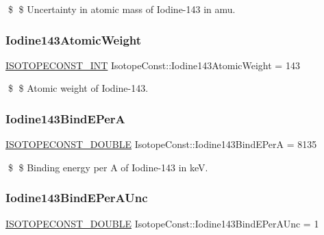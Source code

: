\$ \$ Uncertainty in atomic mass of Iodine-\/143 in amu. \mbox{\label{group___isotope_const-_iodine-_i143_ga991ff8a83be666ace8e998036f409819}} 
\subsubsection{\texorpdfstring{Iodine143\+Atomic\+Weight}{Iodine143AtomicWeight}}
{\footnotesize\ttfamily \mbox{\hyperlink{group___isotope_const-_macros_ga5f18360b3e99483a35c32d789e62621c}{I\+S\+O\+T\+O\+P\+E\+C\+O\+N\+S\+T\+\_\+\+I\+NT}} Isotope\+Const\+::\+Iodine143\+Atomic\+Weight = 143}

\$ \$ Atomic weight of Iodine-\/143. \mbox{\label{group___isotope_const-_iodine-_i143_ga57858d1ec7d61077ab91788b57db1b89}} 
\subsubsection{\texorpdfstring{Iodine143\+Bind\+E\+PerA}{Iodine143BindEPerA}}
{\footnotesize\ttfamily \mbox{\hyperlink{group___isotope_const-_macros_ga8f45a7272ce02c0b4c65c44636ed719a}{I\+S\+O\+T\+O\+P\+E\+C\+O\+N\+S\+T\+\_\+\+D\+O\+U\+B\+LE}} Isotope\+Const\+::\+Iodine143\+Bind\+E\+PerA = 8135}

\$ \$ Binding energy per A of Iodine-\/143 in keV. \mbox{\label{group___isotope_const-_iodine-_i143_ga96e62f1d8375165779cd8d5e5ac00c98}} 
\subsubsection{\texorpdfstring{Iodine143\+Bind\+E\+Per\+A\+Unc}{Iodine143BindEPerAUnc}}
{\footnotesize\ttfamily \mbox{\hyperlink{group___isotope_const-_macros_ga8f45a7272ce02c0b4c65c44636ed719a}{I\+S\+O\+T\+O\+P\+E\+C\+O\+N\+S\+T\+\_\+\+D\+O\+U\+B\+LE}} Isotope\+Const\+::\+Iodine143\+Bind\+E\+Per\+A\+Unc = 1}


